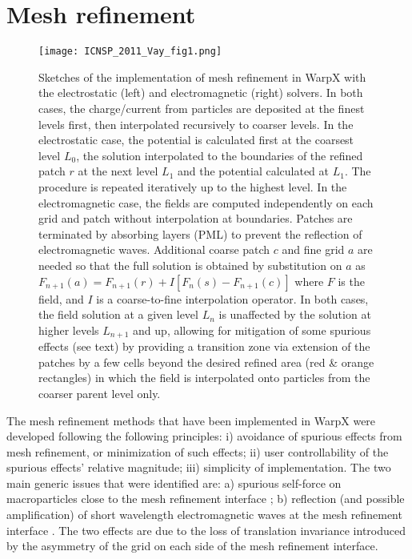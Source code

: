 %
%



\section{Mesh refinement}

\begin{figure}[htb]
  \centering
  \texttt{[image: ICNSP\_2011\_Vay\_fig1.png]}
  \caption{Sketches of the implementation of mesh refinement in WarpX with the electrostatic (left) and electromagnetic (right) solvers. In both cases, the charge/current from particles are deposited at the finest levels first, then interpolated recursively to coarser levels. In the electrostatic case, the potential is calculated first at the coarsest level $L_0$, the solution interpolated to the boundaries of the refined patch $r$ at the next level $L_{1}$ and the potential calculated at $L_1$. The procedure is repeated iteratively up to the highest level.  In the electromagnetic case, the fields are computed independently on each grid and patch without interpolation at boundaries. Patches are terminated by absorbing layers (PML) to prevent the reflection of electromagnetic waves. Additional coarse patch $c$ and fine grid $a$ are needed so that the full solution is obtained by substitution on $a$ as $F_{n+1}(a)=F_{n+1}(r)+I[F_n( s )-F_{n+1}( c )]$ where $F$ is the field, and $I$ is a coarse-to-fine interpolation operator. In both cases, the field solution at a given level $L_n$ is unaffected by the solution at higher levels $L_{n+1}$ and up, allowing for mitigation of some spurious effects (see text) by providing a transition zone via extension of the patches by a few cells beyond the desired refined area (red \& orange rectangles) in which the field is interpolated onto particles from the coarser parent level only.}
  \label{fig:ESAMR}
\end{figure}

The mesh refinement methods that have been implemented in WarpX were developed following the following principles: i) avoidance of spurious effects from mesh refinement, or minimization of such effects; ii) user controllability of the spurious effects' relative magnitude; iii) simplicity of implementation. The two main generic issues that were identified are: a) spurious self-force on macroparticles close to the mesh refinement interface \cite{Vaylpb2002,Colellajcp2010}; b) reflection (and possible amplification) of short wavelength electromagnetic waves at the mesh refinement interface \cite{Vayjcp01}. The two effects are due to the loss of translation invariance introduced by the asymmetry of the grid on each side of the mesh refinement interface.

